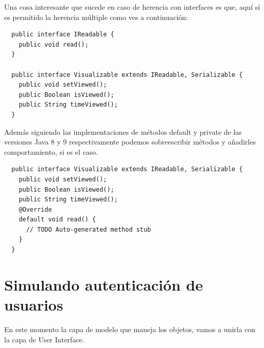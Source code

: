 \documentclass{article}
\begin{document}
Una cosa interesante que sucede en caso de herencia con interfaces es que, aquí
sí es permitido la herencia múltiple como ves a continuación:\\

\begin{verbatim}
  public interface IReadable {
    public void read();
  }

  public interface Visualizable extends IReadable, Serializable {
    public void setViewed();
    public Boolean isViewed();
    public String timeViewed();
  }
\end{verbatim}

Además siguiendo las implementaciones de métodos default y private de las
versiones Java 8 y 9 respectivamente podemos sobreescribir métodos y añadirles
comportamiento, si es el caso.\\

\begin{verbatim}
  public interface Visualizable extends IReadable, Serializable {
    public void setViewed();
    public Boolean isViewed();
    public String timeViewed();
    @Override
    default void read() {
      // TODO Auto-generated method stub
    }
  }
\end{verbatim}


\section{Simulando autenticación de usuarios}%
En este momento la capa de modelo que maneja los objetos, vamos a unirla con la
capa de User Interface.\\
\end{document}
